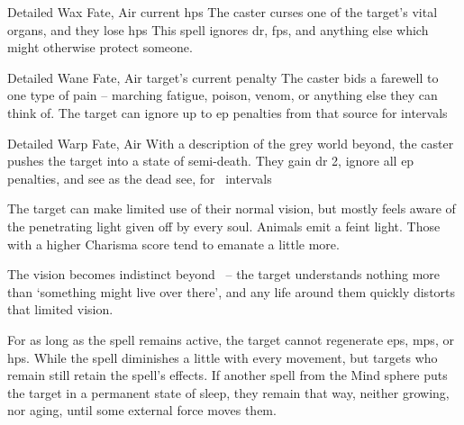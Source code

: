 \ifodd\value{diceNo}
  {Detailed}%
  {Wax}%
  {Fate, Air}%
  {current \glspl{hp}}%
  {The caster curses one of the target's vital organs, and they lose  \glspl{hp}}%
  {This spell ignores \gls{dr}, \glspl{fp}, and anything else which might otherwise protect someone.}

\else

  {Detailed}%
  {Wane}%
  {Fate, Air}%
  {target's current  penalty}%
  {The caster bids a farewell to one type of pain -- marching fatigue, poison, venom, or anything else they can think of.
  The target can ignore up to  \gls{ep} penalties from that source for  \glspl{interval}}%
  {}

  {Detailed}%
  {Warp}%
  {Fate, Air}%
  {}%
  {With a description of the grey world beyond, the caster pushes the target into a state of semi-death.
  They gain \gls{dr} 2, ignore all \gls{ep} penalties, and see as the dead see, for ~\glspl{interval}}%
  {
    The target can make limited use of their normal vision, but mostly feels aware of the penetrating light given off by every soul.
    Animals emit a feint light.
    Those with a higher Charisma score tend to emanate a little more.

    The vision becomes indistinct beyond \spellRange\ -- the target understands nothing more than `something might live over there', and any life around them quickly distorts that limited vision.

    For as long as the spell remains active, the target cannot regenerate \glspl{ep}, \glspl{mp}, or \glspl{hp}.
    While the spell diminishes a little with every movement, but targets who remain still retain the spell's effects.
    If another spell from the Mind sphere puts the target in a permanent state of sleep, they remain that way, neither growing, nor aging, until some external force moves them.
  }

\fi
{}
